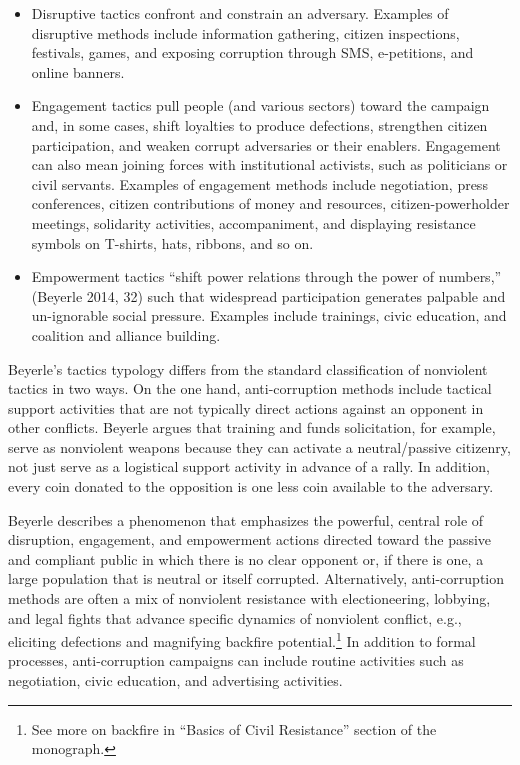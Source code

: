 \documentclass[twoside,a4paper,12pt,fleqn,openany]{extbook}
\begin{document}
\begin{itemize}
\item Disruptive tactics confront and constrain an adversary. Examples of disruptive methods include information gathering, citizen inspections, festivals, games, and exposing corruption through SMS, e-petitions, and online banners.
\item Engagement tactics pull people (and various sectors) toward the campaign and, in some cases, shift loyalties to produce defections, strengthen citizen participation, and weaken corrupt adversaries or their enablers. Engagement can also mean joining forces with institutional activists, such as politicians or civil servants. Examples of engagement methods include negotiation, press conferences, citizen contributions of money and resources, citizen-powerholder meetings, solidarity activities, accompaniment, and displaying resistance symbols on T-shirts, hats, ribbons, and so on.
\item Empowerment tactics “shift power relations through the power of numbers,” (Beyerle 2014, 32) such that widespread participation generates palpable and un-ignorable social pressure. Examples include trainings, civic education, and coalition and alliance building.
\end{itemize}

Beyerle’s tactics typology differs from the standard classification of nonviolent tactics in two ways. On the one hand, anti-corruption methods include tactical support activities that are not typically direct actions against an opponent in other conflicts. Beyerle argues that training and funds solicitation, for example, serve as nonviolent weapons because they can activate a neutral/passive citizenry, not just serve as a logistical support activity in advance of a rally. In addition, every coin donated to the opposition is one less coin available to the adversary.

Beyerle describes a phenomenon that emphasizes the powerful, central role of disruption, engagement, and empowerment actions directed toward the passive and compliant public in which there is no clear opponent or, if there is one, a large population that is neutral
or itself corrupted. Alternatively, anti-corruption methods are often a mix of nonviolent resistance with electioneering, lobbying, and legal fights that advance specific dynamics of nonviolent conflict, e.g., eliciting defections and magnifying backfire potential.\footnote{See more on backfire in “Basics of Civil Resistance” section of the monograph.} In addition to formal processes, anti-corruption campaigns can include routine activities such as negotiation, civic education, and advertising activities.
\end{document}
